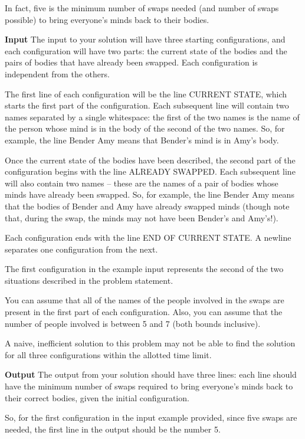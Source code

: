 \normalfont\documentclass[letterpaper,11pt]{article}
\begin{document}
In fact, five is the minimum number of swaps needed (and number of swaps possible) to bring everyone's minds back to their bodies.

\textbf{Input} \newline
The input to your solution will have three starting configurations, and each configuration will have two parts: the current state of the bodies and the pairs of bodies that have already been swapped. Each configuration is independent from the others.

The first line of each configuration will be the line CURRENT STATE, which starts the first part of the configuration. Each subsequent line will contain two names separated by a single whitespace: the first of the two names is the name of the person whose mind is in the body of the second of the two names. So, for example, the line Bender Amy means that Bender's mind is in Amy's body.

Once the current state of the bodies have been described, the second part of the configuration begins with the line ALREADY SWAPPED. Each subsequent line will also contain two names -- these are the names of a pair of bodies whose minds have already been swapped. So, for example, the line Bender Amy means that the bodies of Bender and Amy have already swapped minds (though note that, during the swap, the minds may not have been Bender's and Amy's!).

Each configuration ends with the line END OF CURRENT STATE. A newline separates one configuration from the next.

The first configuration in the example input represents the second of the two situations described in the problem statement.

You can assume that all of the names of the people involved in the swaps are present in the first part of each configuration. Also, you can assume that the number of people involved is between 5 and 7 (both bounds inclusive).

A naive, inefficient solution to this problem may not be able to find the solution for all three configurations within the allotted time limit.

\textbf{Output} \newline
The output from your solution should have three lines: each line should have the minimum number of swaps required to bring everyone's minds back to their correct bodies, given the initial configuration.

So, for the first configuration in the input example provided, since five swaps are needed, the first line in the output should be the number 5.
\end{document}
